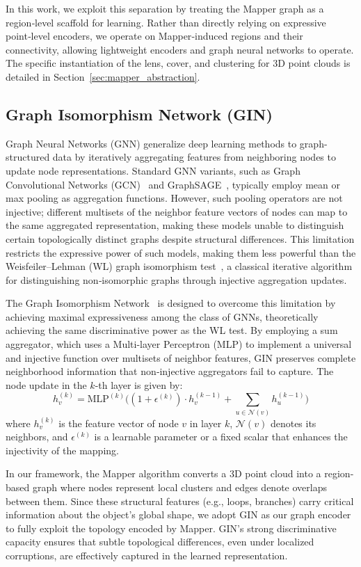 \documentclass{article}
\begin{document}
In this work, we exploit this separation by treating the Mapper graph as a region‑level scaffold for learning. Rather than directly relying on expressive point‑level encoders, we operate on Mapper‑induced regions and their connectivity, allowing lightweight encoders and graph neural networks to operate. 
The specific instantiation of the lens, cover, and clustering for 3D point clouds is detailed in Section~\ref{sec:mapper_abstraction}.

\subsection{Graph Isomorphism Network (GIN)}
Graph Neural Networks (GNN) generalize deep learning methods to graph-structured data by iteratively aggregating features from neighboring nodes to update node representations. 
Standard GNN variants, such as Graph Convolutional Networks (GCN)~\cite{gcn2017} and GraphSAGE~\cite{graphsage2017}, typically employ mean or max pooling as aggregation functions. 
However, such pooling operators are not injective; different multisets of the neighbor feature vectors of nodes can map to the same aggregated representation, making these models unable to distinguish certain topologically distinct graphs despite structural differences.
This limitation restricts the expressive power of such models, making them less powerful than the Weisfeiler–Lehman (WL) graph isomorphism test~\cite{weisfeiler1968reduction}, a classical iterative algorithm for distinguishing non‑isomorphic graphs through injective aggregation updates.

The Graph Isomorphism Network~\cite{gin2019} is designed to overcome this limitation by achieving maximal expressiveness among the class of GNNs, theoretically achieving the same discriminative power as the WL test. 
By employing a sum aggregator, which uses a Multi-layer Perceptron (MLP) to implement a universal and injective function over multisets of neighbor features, GIN preserves complete neighborhood information that non‑injective aggregators fail to capture. 
The node update in the $k$-th layer is given by:
$$ h_v^{(k)} = \text{MLP}^{(k)} \Big( (1 + \epsilon^{(k)}) \cdot h_v^{(k-1)} +\!\! \sum_{u \in \mathcal{N}(v)}\!\! h_u^{(k-1)} \Big) $$
where $h_v^{(k)}$ is the feature vector of node $v$ in layer $k$, $\mathcal{N}(v)$ denotes its neighbors, and $\epsilon^{(k)}$ is a learnable parameter or a fixed scalar that enhances the injectivity of the mapping.

In our framework, the Mapper algorithm converts a 3D point cloud into a region-based graph where nodes represent local clusters and edges denote overlaps between them. 
Since these structural features (e.g., loops, branches) carry critical information about the object's global shape, we adopt GIN as our graph encoder to fully exploit the topology encoded by Mapper.
GIN’s strong discriminative capacity ensures that subtle topological differences, even under localized corruptions, are effectively captured in the learned representation.
\end{document}
